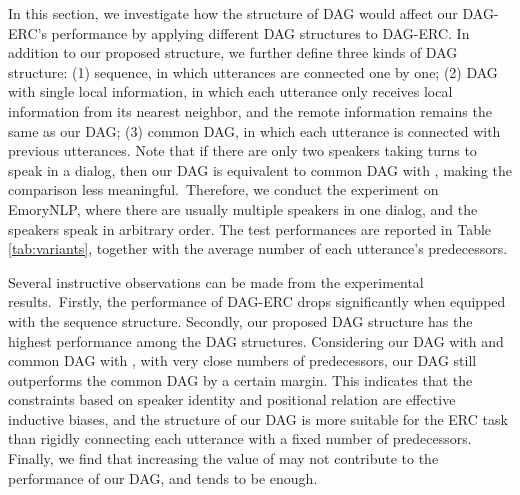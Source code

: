\documentclass[11pt,a4paper]{article}
\begin{document}
In this section, we investigate how the structure of DAG would affect our DAG-ERC's performance by applying different DAG structures to DAG-ERC. 
In addition to our proposed structure, we further define three kinds of DAG structure: 
(1) sequence, in which utterances are connected one by one; 
(2) DAG with single local information, in which each utterance only receives local information from its nearest neighbor, and the remote information remains the same as our DAG;
(3) common DAG, in which each utterance is connected with  previous utterances.  
Note that if there are only two speakers taking turns to speak in a dialog, then our DAG is equivalent to common DAG with , making the comparison less meaningful.~Therefore, we conduct the experiment on EmoryNLP, where there are usually multiple speakers in one dialog, and the speakers speak in arbitrary order. The test performances are reported in Table \ref{tab:variants}, together with the average number of each utterance's predecessors.

Several instructive observations can be made from the experimental results.~Firstly, the performance of DAG-ERC drops significantly when equipped with the sequence structure. 
Secondly, our proposed DAG structure has the highest performance among the DAG structures. 
Considering our DAG with  and common DAG with , with very close numbers of predecessors, our DAG still outperforms the common DAG by a certain margin.
This indicates that the constraints based on speaker identity and positional relation are effective inductive biases, and the structure of our DAG is more suitable for the ERC task than rigidly connecting each utterance with a fixed number of predecessors.
Finally, we find that increasing the value of  may not contribute to the performance of our DAG, and  tends to be enough.

\begin{table}[t]
	\centering
	\small
	\caption{Different DAGs applied to DAG-ERC.}
	\label{tab:variants}
\end{table}
\end{document}
